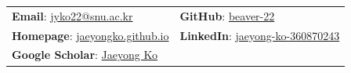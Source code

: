 \documentclass[letterpaper, 11pt]{article}
\begin{document}


\vspace{0.5cm} 
\begin{center}
\begin{tabular}{ll}
\textbf{Email}: \href{mailto:jyko22@snu.ac.kr}{jyko22@snu.ac.kr}      &
\hspace{0.50in} \textbf{GitHub}: \href{https://github.com/beaver-22}{beaver-22} \\
\textbf{Homepage}: \href{https://jaeyongko.github.io}{jaeyongko.github.io} &
\hspace{0.50in} \textbf{LinkedIn}: \href{https://www.linkedin.com/in/jaeyong-ko-360870243/}{jaeyong-ko-360870243} \\
\textbf{Google Scholar}: \href{https://scholar.google.com/citations?user=WyEy86AAAAAJ}{Jaeyong Ko} & \\

\end{tabular}
\end{center}


\setlength{\tabcolsep}{8pt}
\end{document}
